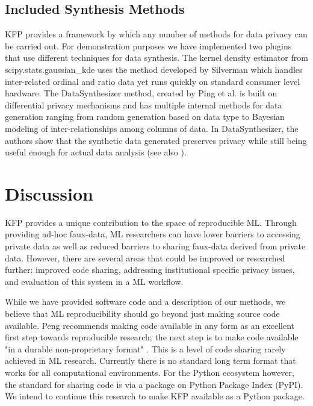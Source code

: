 \documentclass{article}
\begin{document}
\subsection{Included Synthesis Methods}

KFP provides a framework by which any number of methods for data privacy can be carried out. For demonstration purposes we have implemented two plugins that use different techniques for data synthesis. The kernel density estimator from scipy.stats.gaussian\_kde uses the method developed by Silverman \cite{silverman_density_1986} which handles inter-related ordinal and ratio data yet runs quickly on standard consumer level hardware. The DataSynthesizer method, created by Ping et al. \cite{ping17datasynthesizer} is built on differential privacy mechanisms and has multiple internal methods for data generation ranging from random generation based on data type to Bayesian modeling of inter-relationships among columns of data. In DataSynthesizer, the authors show that the synthetic data generated preserves privacy while still being useful enough for actual data analysis (see also \cite{howe_synthetic_2017}).

\section{Discussion}

KFP provides a unique contribution to the space of reproducible ML. Through providing ad-hoc faux-data, ML researchers can have lower barriers to accessing private data as well as reduced barriers to sharing faux-data derived from private data. However, there are several areas that could be improved or researched further: improved code sharing, addressing institutional specific privacy issues, and evaluation of this system in a ML workflow.

While we have provided software code and a description of our methods, we believe that ML reproducibility should go beyond just making source code available. Peng recommends making code available in any form as an excellent first step towards reproducible research; the next step is to make code available "in a durable non-proprietary format" \cite{peng_reproducible_2011}. This is a level of code sharing rarely achieved in ML research. Currently there is no standard long term format that works for all computational environments. For the Python ecosystem however, the standard for sharing code is via a package on Python Package Index (PyPI). We intend to continue this research to make KFP available as a Python package.
\end{document}
